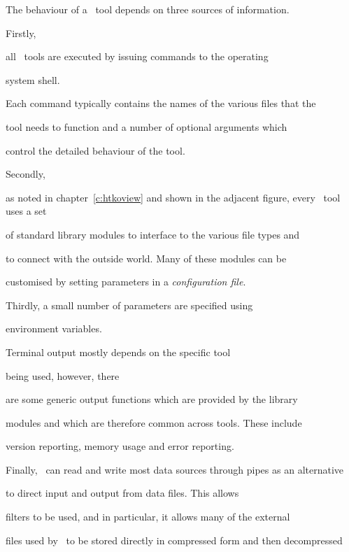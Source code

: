 






The behaviour of a \HTK\ tool depends on three sources of information.


Firstly,


all \HTK\ tools are executed by issuing commands to the operating


system shell.  


Each command typically contains the names of the various files that the


tool needs to function and a number of optional arguments which 


control the detailed behaviour of the tool.  


Secondly, 


as noted in chapter~\ref{c:htkoview} and shown in the adjacent figure, every \HTK\ tool uses a set


of standard library modules to interface to the various file types and


to connect with the outside world.  Many of these modules can be


customised by setting parameters in a {\it configuration file}.


Thirdly, a small number of parameters are specified using


environment variables.  





Terminal output mostly depends on the specific tool 


being used, however, there


are some generic output functions which are provided by the library


modules and which are therefore common across tools.  These include


version reporting, memory usage and error reporting.





Finally, \HTK\ can read and write most data sources through pipes as an alternative


to direct input and output from data files.  This allows 


filters to be used, and in particular, it allows many of the external


files used by \HTK\ to be stored directly in compressed form and then decompressed


